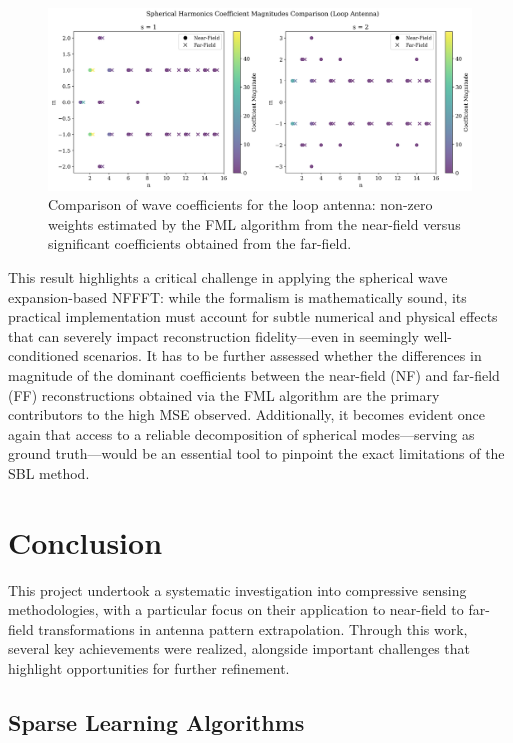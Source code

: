 \documentclass{article}
\begin{document}
\begin{figure}[H]
    \centering
    \includegraphics[width=1\linewidth]{Figures/loop_nf_ff_weights.png}
    \caption{Comparison of wave coefficients for the loop antenna: non-zero weights estimated by the FML algorithm from the near-field versus significant coefficients obtained from the far-field.}
    \label{fig:loop_nfff_weights}
\end{figure}

This result highlights a critical challenge in applying the spherical wave expansion-based NFFFT: while the formalism is mathematically sound, its practical implementation must account for subtle numerical and physical effects that can severely impact reconstruction fidelity—even in seemingly well-conditioned scenarios. It has to be further assessed whether the differences in magnitude of the dominant coefficients between the near-field (NF) and far-field (FF) reconstructions obtained via the FML algorithm are the primary contributors to the high MSE observed. Additionally, it becomes evident once again that access to a reliable decomposition of spherical modes—serving as ground truth—would be an essential tool to pinpoint the exact limitations of the SBL method.


\section{Conclusion}

This project undertook a systematic investigation into compressive sensing methodologies, with a particular focus on their application to near-field to far-field transformations in antenna pattern extrapolation. Through this work, several key achievements were realized, alongside important challenges that highlight opportunities for further refinement.

\subsection{Sparse Learning Algorithms}
\end{document}
